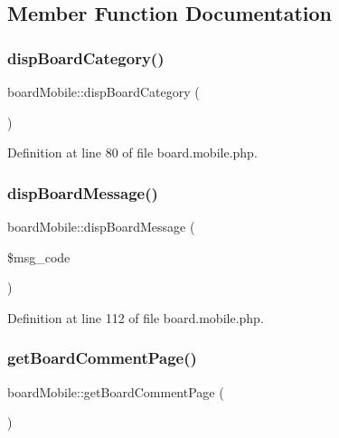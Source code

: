 \subsection{Member Function Documentation}
\mbox{\label{classboardMobile_a8a6e7bb91059739116011375cf62ff91}} 
\subsubsection{\texorpdfstring{disp\+Board\+Category()}{dispBoardCategory()}}
{\footnotesize\ttfamily board\+Mobile\+::disp\+Board\+Category (\begin{DoxyParamCaption}{ }\end{DoxyParamCaption})}



Definition at line 80 of file board.\+mobile.\+php.

\mbox{\label{classboardMobile_aa25065243c3bfab1ef936b7db897a527}} 
\subsubsection{\texorpdfstring{disp\+Board\+Message()}{dispBoardMessage()}}
{\footnotesize\ttfamily board\+Mobile\+::disp\+Board\+Message (\begin{DoxyParamCaption}\item[{}]{\$msg\+\_\+code }\end{DoxyParamCaption})}



Definition at line 112 of file board.\+mobile.\+php.

\mbox{\label{classboardMobile_a023ac488f13a61b76acf5a22c1a64e8a}} 
\subsubsection{\texorpdfstring{get\+Board\+Comment\+Page()}{getBoardCommentPage()}}
{\footnotesize\ttfamily board\+Mobile\+::get\+Board\+Comment\+Page (\begin{DoxyParamCaption}{ }\end{DoxyParamCaption})}



